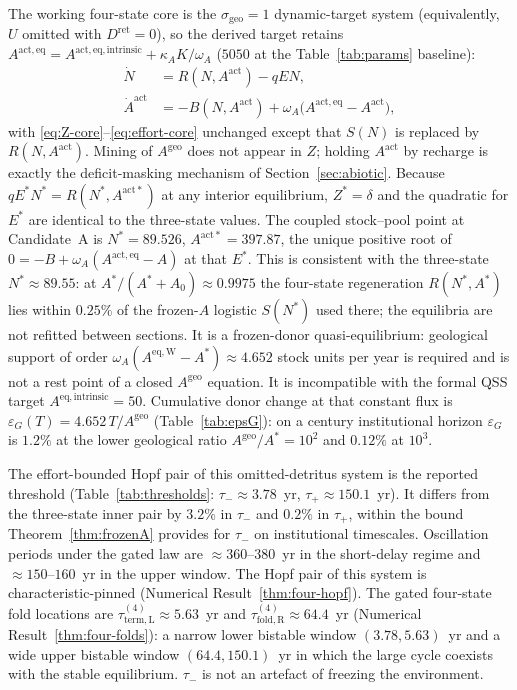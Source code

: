 \documentclass[11pt]{article}
\theoremstyle{definition}
\begin{document}
The working four-state core is the $\sigma_{\mathrm{geo}}=1$ dynamic-target system (equivalently, $U$ omitted with $D^{\mathrm{ret}}=0$), so the derived target retains $A^{\mathrm{act,eq}}=A^{\mathrm{act,eq,intrinsic}}+\kappa_A K/\omega_A$ ($5050$ at the Table~\ref{tab:params} baseline):
\begin{align}
\dot N &= R(N,A^{\mathrm{act}})-qEN,\\
\dot A^{\mathrm{act}} &= -B(N,A^{\mathrm{act}})+\omega_A\bigl(A^{\mathrm{act,eq}}-A^{\mathrm{act}}\bigr),
\label{eq:four-state-working}
\end{align}
with \eqref{eq:Z-core}--\eqref{eq:effort-core} unchanged except that $S(N)$ is replaced by $R(N,A^{\mathrm{act}})$. Mining of $A^{\mathrm{geo}}$ does not appear in $Z$; holding $A^{\mathrm{act}}$ by recharge is exactly the deficit-masking mechanism of Section~\ref{sec:abiotic}. Because $qE^*N^*=R(N^*,A^{\mathrm{act}*})$ at any interior equilibrium, $Z^*=\delta$ and the quadratic for $E^*$ are identical to the three-state values. The coupled stock--pool point at Candidate~A is $N^*=89.526$, $A^{\mathrm{act}*}=397.87$, the unique positive root of $0=-B+\omega_A(A^{\mathrm{act,eq}}-A)$ at that $E^*$. This is consistent with the three-state $N^*\approx 89.55$: at $A^*/(A^*+A_0)\approx 0.9975$ the four-state regeneration $R(N^*,A^*)$ lies within $0.25\%$ of the frozen-$A$ logistic $S(N^*)$ used there; the equilibria are not refitted between sections. It is a frozen-donor quasi-equilibrium: geological support of order $\omega_A(A^{\mathrm{eq,W}}-A^*)\approx 4.652$ stock units per year is required and is not a rest point of a closed $A^{\mathrm{geo}}$ equation. It is incompatible with the formal QSS target $A^{\mathrm{eq,intrinsic}}=50$. Cumulative donor change at that constant flux is $\varepsilon_G(T)=4.652\,T/A^{\mathrm{geo}}$ (Table~\ref{tab:epsG}): on a century institutional horizon $\varepsilon_G$ is $1.2\%$ at the lower geological ratio $A^{\mathrm{geo}}/A^*=10^2$ and $0.12\%$ at $10^3$.

The effort-bounded Hopf pair of this omitted-detritus system is the reported threshold (Table~\ref{tab:thresholds}: $\tau_-\approx 3.78$~yr, $\tau_+\approx 150.1$~yr). It differs from the three-state inner pair by $3.2\%$ in $\tau_-$ and $0.2\%$ in $\tau_+$, within the bound Theorem~\ref{thm:frozenA} provides for $\tau_-$ on institutional timescales. Oscillation periods under the gated law are $\approx 360$--$380$~yr in the short-delay regime and $\approx 150$--$160$~yr in the upper window. The Hopf pair of this system is characteristic-pinned (Numerical Result~\ref{thm:four-hopf}). The gated four-state fold locations are $\tau_{\mathrm{term,L}}^{(4)}\approx 5.63$~yr and $\tau_{\mathrm{fold,R}}^{(4)}\approx 64.4$~yr (Numerical Result~\ref{thm:four-folds}): a narrow lower bistable window $(3.78,5.63)$~yr and a wide upper bistable window $(64.4,150.1)$~yr in which the large cycle coexists with the stable equilibrium. $\tau_-$ is not an artefact of freezing the environment.
\end{document}

